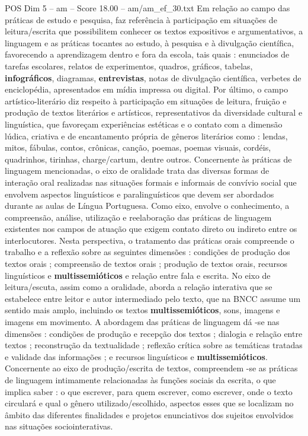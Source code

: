 \begin{textsample}{POS Dim 5 – am – Score 18.00 – am/am\_ef\_30.txt}
Em relação ao campo das práticas de estudo e pesquisa, faz referência à participação em situações de leitura/escrita que possibilitem conhecer os textos expositivos e argumentativos, a linguagem e as práticas tocantes ao estudo, à pesquisa e à divulgação científica, favorecendo a aprendizagem dentro e fora da escola, tais quais : enunciados de tarefas escolares, relatos de experimentos, quadros, gráficos, tabelas, \textbf{infográficos}, diagramas, \textbf{entrevistas}, notas de divulgação científica, verbetes de enciclopédia, apresentados em mídia impressa ou digital.
Por último, o campo artístico-literário diz respeito à participação em situações de leitura, fruição e produção de textos literários e artísticos, representativos da diversidade cultural e linguística, que favoreçam experiências estéticas e o contato com a dimensão lúdica, criativa e de encantamento própria de gêneros literários como : lendas, mitos, fábulas, contos, crônicas, canção, poemas, poemas visuais, cordéis, quadrinhos, tirinhas, charge/cartum, dentre outros.
Concernente às práticas de linguagem mencionadas, o eixo de oralidade trata das diversas formas de interação oral realizadas nas situações formais e informais de convívio social que envolvem aspectos linguísticos e paralinguísticos que devem ser abordados durante as aulas de Língua Portuguesa.
Como eixo, envolve o conhecimento, a compreensão, análise, utilização e reelaboração das práticas de linguagem existentes nos campos de atuação que exigem contato direto ou indireto entre os interlocutores.
Nesta perspectiva, o tratamento das práticas orais compreende o trabalho e a reflexão sobre as seguintes dimensões : condições de produção dos textos orais ; compreensão de textos orais ; produção de textos orais, recursos linguísticos e \textbf{multissemióticos} e relação entre fala e escrita.
No eixo de leitura/escuta, assim como a oralidade, aborda a relação interativa que se estabelece entre leitor e autor intermediado pelo texto, que na BNCC assume um sentido mais amplo, incluindo os textos \textbf{multissemióticos}, sons, imagens e imagens em movimento.
A abordagem das práticas de linguagem dá -se nas dimensões : condições de produção e recepção dos textos ; dialogia e relação entre textos ; reconstrução da textualidade ; reflexão crítica sobre as temáticas tratadas e validade das informações ; e recursos linguísticos e \textbf{multissemióticos}.
Concernente ao eixo de produção/escrita de textos, compreendem -se as práticas de linguagem intimamente relacionadas às funções sociais da escrita, o que implica saber : o que escrever, para quem escrever, como escrever, onde o texto circulará e qual o gênero utilizado/escolhido, aspectos esses que se localizam no âmbito das diferentes finalidades e projetos enunciativos dos sujeitos envolvidos nas situações sociointerativas.

\end{textsample}

